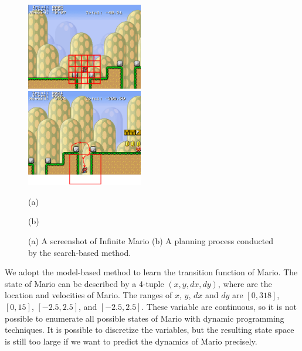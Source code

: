 \begin{figure}[t]
 \begin{minipage}[b]{0.5\linewidth}
    \begin{center}
    \includegraphics[width=2.0in] {./figures/MarioGrid.eps}
\end{center}
\end{minipage}
\begin{minipage}[b]{0.5\linewidth}
    \begin{center}
    \includegraphics[width=2.0in] {./figures/MarioModel.eps}
\end{center}
\end{minipage}
\begin{minipage}[b]{0.5\linewidth} \centering (a) \end{minipage}
\begin{minipage}[b]{0.5\linewidth} \centering (b) \end{minipage}

\caption{(a) A screenshot of Infinite Mario (b) A planning process conducted by the search-based method.}
\label{fig:Mario}
\end{figure}


We adopt the model-based method to learn the transition function of Mario.
The state of Mario 
can be described by a 4-tuple $(x, y, dx, dy)$, where are the location and velocities of Mario. 
The ranges of $x$, $y$, $dx$ and $dy$ are $[0, 318]$, $[0, 15]$, $[-2.5, 2.5]$, and $[-2.5, 2.5]$.
These variable are continuous, so it is not possible to enumerate all possible states
of Mario with dynamic programming techniques. It is possible to discretize the variables, but the resulting state space 
is still too large if we want to predict the dynamics of Mario precisely.

